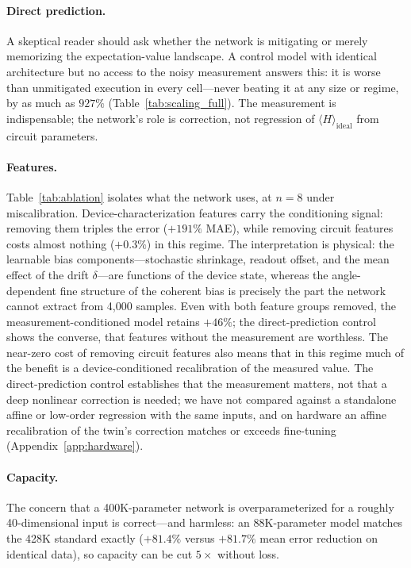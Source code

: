 \documentclass[11pt]{article}
\newcommand{\expect}[1]{\langle#1\rangle}
\newcommand{\Hideal}{\expect{H}_{\mathrm{ideal}}}
\begin{document}
\paragraph{Direct prediction.}
A skeptical reader should ask whether the network is mitigating or merely memorizing the expectation-value landscape. A control model with identical architecture but no access to the noisy measurement answers this: it is worse than unmitigated execution in every cell---never beating it at any size or regime, by as much as $927\%$ (Table~\ref{tab:scaling_full}). The measurement is indispensable; the network's role is correction, not regression of $\Hideal$ from circuit parameters.

\paragraph{Features.}
Table~\ref{tab:ablation} isolates what the network uses, at $n=8$ under miscalibration. Device-characterization features carry the conditioning signal: removing them triples the error ($+191\%$ MAE), while removing circuit features costs almost nothing ($+0.3\%$) in this regime. The interpretation is physical: the learnable bias components---stochastic shrinkage, readout offset, and the mean effect of the drift $\delta$---are functions of the device state, whereas the angle-dependent fine structure of the coherent bias is precisely the part the network cannot extract from 4{,}000 samples. Even with both feature groups removed, the measurement-conditioned model retains $+46\%$; the direct-prediction control shows the converse, that features without the measurement are worthless. The near-zero cost of removing circuit features also means that in this regime much of the benefit is a device-conditioned recalibration of the measured value. The direct-prediction control establishes that the measurement matters, not that a deep nonlinear correction is needed; we have not compared against a standalone affine or low-order regression with the same inputs, and on hardware an affine recalibration of the twin's correction matches or exceeds fine-tuning (Appendix~\ref{app:hardware}).

\paragraph{Capacity.}
The concern that a 400K-parameter network is overparameterized for a roughly 40-dimensional input is correct---and harmless: an 88K-parameter model matches the 428K standard exactly ($+81.4\%$ versus $+81.7\%$ mean error reduction on identical data), so capacity can be cut $5\times$ without loss.
\end{document}

